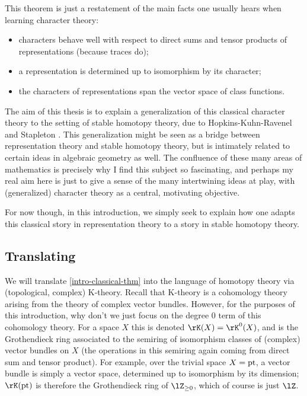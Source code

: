 This theorem is just a restatement of the main facts one usually hears
when learning character theory:
\begin{itemize}
\item characters behave well with respect to direct sums and tensor
  products of representations (because traces do);
\item a representation is determined up to isomorphism by its
  character;
\item the characters of representations span the vector space of class
  functions.
\end{itemize}

The aim of this thesis is to explain a generalization of this
classical character theory to the setting of stable homotopy theory,
due to Hopkins-Kuhn-Ravenel \cite{hkr-char} and Stapleton
\cite{stapleton-tgcm}. This generalization might be seen as a bridge
between representation theory and stable homotopy theory, but is
intimately related to certain ideas in algebraic geometry as well. The
confluence of these many areas of mathematics is precisely why I find
this subject so fascinating, and perhaps my real aim here is just to
give a sense of the many intertwining ideas at play, with
(generalized) character theory as a central, motivating objective.

For now though, in this introduction, we simply seek to explain how
one adapts this classical story in representation theory to a story in
stable homotopy theory.


\subsection{Translating}
\label{intro-trans}

We will translate \cref{intro-classical-thm} into the language of
homotopy theory via (topological, complex) K-theory. Recall that
K-theory is a cohomology theory arising from the theory of complex
vector bundles. However, for the purposes of this introduction, why
don't we just focus on the degree $0$ term of this cohomology
theory. For a space $X$ this is denoted $\rK(X) = \rK^0(X)$, and is
the Grothendieck ring associated to the semiring of isomorphism
classes of (complex) vector bundles on $X$ (the operations in this
semiring again coming from direct sum and tensor product). For
example, over the trivial space $X = \mathrm{pt}$, a vector bundle is simply a
vector space, determined up to isomorphism by its dimension;
$\rK(\pt)$ is therefore the Grothendieck ring of $\lZ_{\ge 0}$, which
of course is just $\lZ$.


